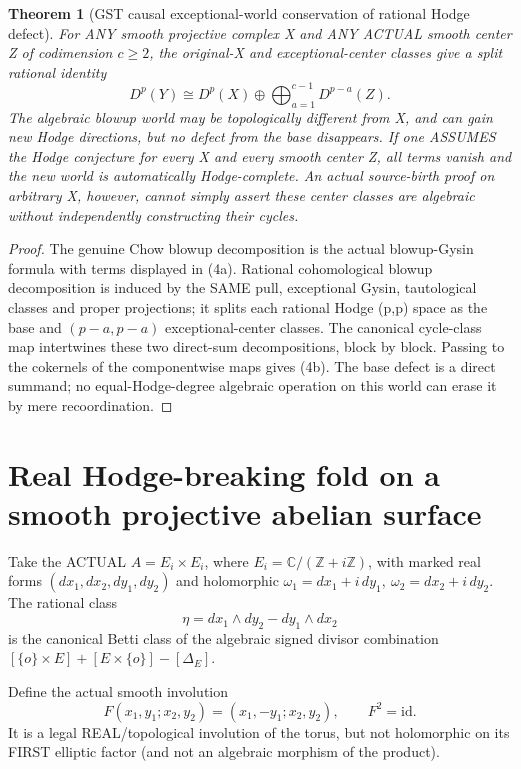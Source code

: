 \documentclass[11pt]{article}
\newtheorem{theorem}{Theorem}
\begin{document}
\begin{theorem}[GST causal exceptional-world conservation of rational Hodge defect]
For ANY smooth projective complex X and ANY
ACTUAL smooth center Z of codimension \(c\ge2\),
the original-X and exceptional-center classes
give a split rational identity
\[
 \boxed{
 D^p(Y)\cong D^p(X)\oplus
       \bigoplus_{a=1}^{c-1}D^{p-a}(Z).
 }                                                        \tag{4b}
\]
The algebraic blowup world may be topologically
different from X, and can gain new Hodge directions,
but no defect from the base disappears.
If one ASSUMES the Hodge conjecture for every X
and every smooth center Z, all terms vanish and
the new world is automatically Hodge-complete.
An actual source-birth proof on arbitrary X,
however, cannot simply assert these center classes
are algebraic without independently constructing
their cycles.
\end{theorem}
\begin{proof}
The genuine Chow blowup decomposition is the
actual blowup-Gysin formula with terms displayed
in (4a). Rational cohomological blowup
decomposition is induced by the SAME pull,
exceptional Gysin, tautological classes and
proper projections; it splits each rational
Hodge (p,p) space as the base and
\((p-a,p-a)\) exceptional-center classes.
The canonical cycle-class map intertwines
these two direct-sum decompositions, block by
block. Passing to the cokernels of the
componentwise maps gives (4b).
The base defect is a direct summand; no
equal-Hodge-degree algebraic operation on
this world can erase it by mere recoordination.
\end{proof}

\section{Real Hodge-breaking fold on a smooth projective abelian surface}
Take the ACTUAL \(A=E_i\times E_i\), where
\(E_i=\mathbb C/(\mathbb Z+i\mathbb Z)\),
with marked real forms \((dx_1,dx_2,dy_1,dy_2)\)
and holomorphic
\(\omega_1=dx_1+i\,dy_1,\ \omega_2=dx_2+i\,dy_2\).
The rational class
\[
 \eta=dx_1\wedge dy_2-dy_1\wedge dx_2
\]
is the canonical Betti class of the
algebraic signed divisor combination
\([\{o\}\times E]+[E\times\{o\}]-[\Delta_E]\).

Define the actual smooth involution
\[
 F(x_1,y_1;x_2,y_2)=(x_1,-y_1;x_2,y_2),
 \qquad F^2=\mathrm{id}.
\]
It is a legal REAL/topological involution of the torus,
but not holomorphic on its FIRST elliptic factor
(and not an algebraic morphism of the product).
\end{document}

